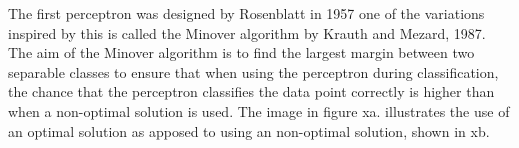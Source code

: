 The first perceptron was designed by Rosenblatt in 1957 one of the variations inspired by this is called the Minover algorithm by Krauth and Mezard, 1987.   The aim of the Minover algorithm is to find the largest margin between two separable classes to ensure that when using the perceptron during classification, the chance that the perceptron classifies the data point correctly is higher than when a non-optimal solution is used. The image in figure xa. illustrates the use of an optimal solution as apposed to using an non-optimal solution, shown in xb.


